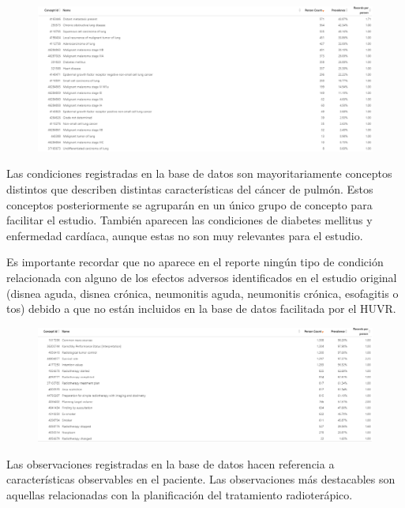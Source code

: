 \begin{figure}[H]
    \centering
    \includegraphics[width=1\textwidth]{tables/conditionOcurrenceREPORT.png}
    \label{table:conditionOcurrenceREPORT}
\end{figure}

Las condiciones registradas en la base de datos son mayoritariamente conceptos distintos que describen distintas características del cáncer de pulmón. Estos conceptos posteriormente se agruparán en un único grupo de concepto para facilitar el estudio. También aparecen las condiciones de diabetes mellitus y enfermedad cardíaca, aunque estas no son muy relevantes para el estudio.

Es importante recordar que no aparece en el reporte ningún tipo de condición relacionada con alguno de los efectos adversos identificados en el estudio original (disnea aguda, disnea crónica, neumonitis aguda, neumonitis crónica, esofagitis o tos) debido a que no están incluidos en la base de datos facilitada por el HUVR.

\begin{figure}[H]
    \centering
    \includegraphics[width=1\textwidth]{tables/observationREPORT.png}
    \label{figure:observationREPORT}
\end{figure}

Las observaciones registradas en la base de datos hacen referencia a características observables en el paciente. Las observaciones más destacables son aquellas relacionadas con la planificación del tratamiento radioterápico.

